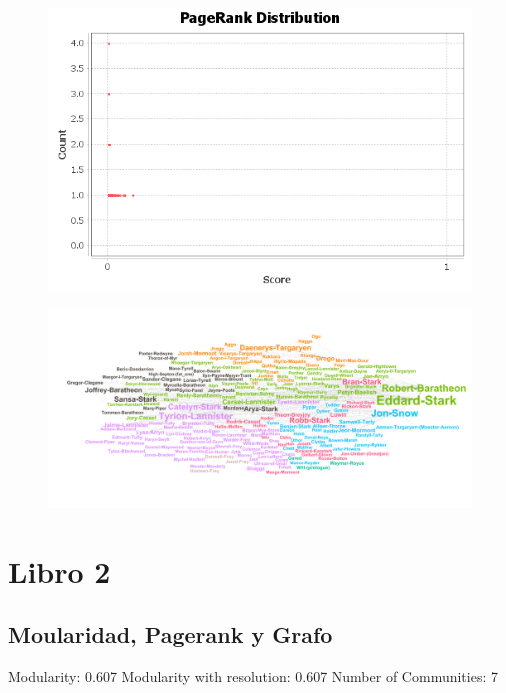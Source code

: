 \documentclass[]{article}
\begin{document}
\begin{figure}[htbp]  
\centering
\includegraphics{prb1/pageranks.png}
\end{figure}

\begin{figure}[htbp]  
\centering
\includegraphics{b1.png}
\end{figure}

\newpage

\section{Libro 2}\label{libro-2}

\subsection{Moularidad, Pagerank y
Grafo}\label{moularidad-pagerank-y-grafo-1}

Modularity: 0.607 Modularity with resolution: 0.607 Number of
Communities: 7
\end{document}
